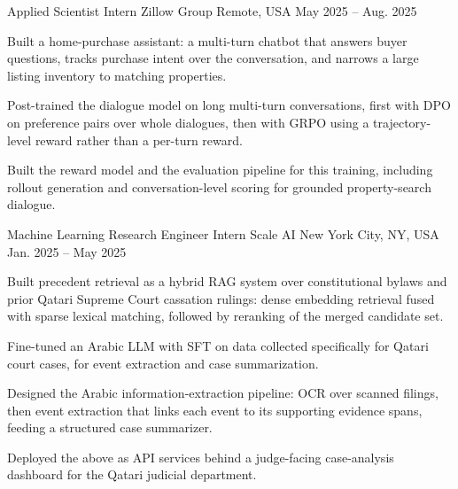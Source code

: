 
\begin{cventries}
  \cventry
    {Applied Scientist Intern}
    {Zillow Group}
    {Remote, USA}
    {May 2025 -- Aug. 2025}
    {
      \begin{cvitems}
        \item Built a home-purchase assistant: a multi-turn chatbot that answers buyer questions, tracks purchase intent over the conversation, and narrows a large listing inventory to matching properties.
        \item Post-trained the dialogue model on long multi-turn conversations, first with DPO on preference pairs over whole dialogues, then with GRPO using a trajectory-level reward rather than a per-turn reward.
        \item Built the reward model and the evaluation pipeline for this training, including rollout generation and conversation-level scoring for grounded property-search dialogue.
      \end{cvitems}
    }

  \cventry
    {Machine Learning Research Engineer Intern}
    {Scale AI}
    {New York City, NY, USA}
    {Jan. 2025 -- May 2025}
    {
      \begin{cvitems}
        \item Built precedent retrieval as a hybrid RAG system over constitutional bylaws and prior Qatari Supreme Court cassation rulings: dense embedding retrieval fused with sparse lexical matching, followed by reranking of the merged candidate set.
        \item Fine-tuned an Arabic LLM with SFT on data collected specifically for Qatari court cases, for event extraction and case summarization.
        \item Designed the Arabic information-extraction pipeline: OCR over scanned filings, then event extraction that links each event to its supporting evidence spans, feeding a structured case summarizer.
        \item Deployed the above as API services behind a judge-facing case-analysis dashboard for the Qatari judicial department.
      \end{cvitems}
    }


\end{cventries}
